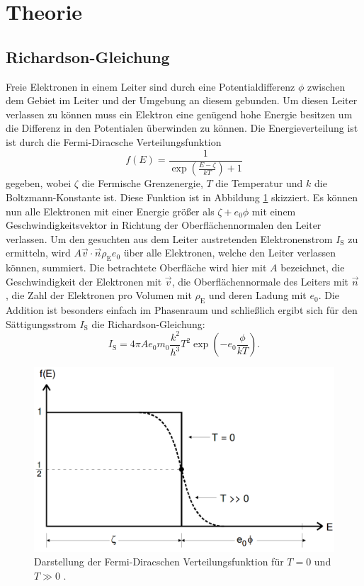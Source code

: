 
\section{Theorie}
\label{sec:Theorie}

\subsection{Richardson-Gleichung}
Freie Elektronen in einem Leiter sind durch eine Potentialdifferenz $\phi$ zwischen dem Gebiet im Leiter und der Umgebung an diesem gebunden. Um diesen Leiter verlassen zu können muss ein Elektron eine genügend hohe Energie besitzen um die Differenz in den Potentialen überwinden zu können. Die Energieverteilung ist ist durch die Fermi-Diracsche Verteilungsfunktion 
\begin{equation}
	f(E) = \frac{1}{\exp\left(\frac{E-\zeta}{k T}\right)+1}\label{eq:Fermi-Diracsche_Verteilungsfunktion}
\end{equation} 
gegeben, wobei $\zeta$ die Fermische Grenzenergie, $T$ die Temperatur und $k$ die Boltzmann-Konstante ist. Diese Funktion ist in Abbildung \ref{fig:Fermi-Diracsche} skizziert. Es können nun alle Elektronen mit einer Energie größer als $\zeta + e_0 \phi$ mit einem Geschwindigkeitsvektor in Richtung der Oberflächennormalen den Leiter verlassen. Um den gesuchten aus dem Leiter austretenden Elektronenstrom $I_\text{S}$ zu ermitteln, wird $A \vec{v}\cdot \vec{n} \rho_\text{E} e_0$ über alle Elektronen, welche den Leiter verlassen können, summiert. Die betrachtete Oberfläche wird hier mit $A$ bezeichnet, die Geschwindigkeit der Elektronen mit $\vec{v}$, die Oberflächennormale des Leiters mit $\vec{n}$ , die Zahl der Elektronen pro Volumen mit $\rho_\text{E}$ und deren Ladung mit $e_0$. Die Addition ist besonders einfach im Phasenraum und schließlich ergibt sich für den Sättigungsstrom $I_\text{S}$ die Richardson-Gleichung: 
\begin{equation}
	I_\text{S} = 4 \pi A e_0 m_0 \frac{k^2}{h^3} T^2 \exp\left(-e_0 \frac{\phi}{k T}\right)\text{.} \label{eq:Richardson-Gleichung}
\end{equation}
\begin{figure}
	\centering
	\includegraphics[width=\linewidth-100pt,height=\textheight-100pt,keepaspectratio]{content/Bilder/Fermi-Diracsche_Verteilung.png}
	\caption{Darstellung der Fermi-Diracschen Verteilungsfunktion für $T=0$ und $T\gg0$ \cite{V504}.}
	\label{fig:Fermi-Diracsche}
\end{figure}


